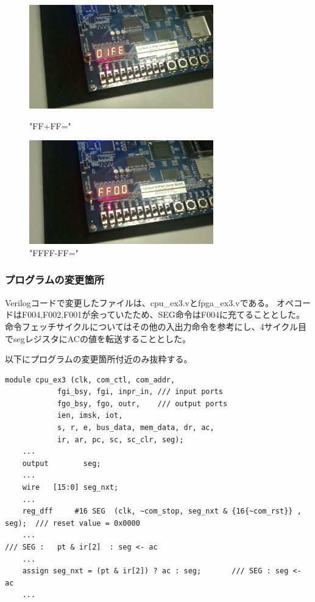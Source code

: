 \documentclass{jsarticle}
\begin{document}
\begin{figure}[htbp]
 \begin{minipage}{0.5\hsize}
  \begin{center}
  \includegraphics[width=8cm,bb=0 0 1920 1080]{FF+FF.png}
  \end{center}
  \caption{"FF+FF="}
 \end{minipage}
 \begin{minipage}{0.5\hsize}
  \begin{center}
   \includegraphics[width=8cm,bb=0 0 1920 1080]{FFFF-FF.png}
  \end{center}
  \caption{"FFFF-FF="}
 \end{minipage}
\end{figure}

\subsubsection*{プログラムの変更箇所}
Verilogコードで変更したファイルは、cpu\_ex3.vとfpga\_ex3.vである。
オペコードはF004,F002,F001が余っていたため、SEG命令はF004に充てることとした。
命令フェッチサイクルについてはその他の入出力命令を参考にし、4サイクル目でsegレジスタにACの値を転送することとした。

以下にプログラムの変更箇所付近のみ抜粋する。

\begin{lstlisting}[caption=cpu\_ex3.v]
module cpu_ex3 (clk, com_ctl, com_addr,
            fgi_bsy, fgi, inpr_in, /// input ports
            fgo_bsy, fgo, outr,    /// output ports
            ien, imsk, iot,
            s, r, e, bus_data, mem_data, dr, ac,
            ir, ar, pc, sc, sc_clr, seg);
    ...
    output        seg;
    ...
    wire   [15:0] seg_nxt;
    ...
    reg_dff     #16 SEG  (clk, ~com_stop, seg_nxt & {16{~com_rst}} , seg);  /// reset value = 0x0000
    ...
/// SEG :   pt & ir[2]  : seg <- ac
    ...
    assign seg_nxt = (pt & ir[2]) ? ac : seg;       /// SEG : seg <- ac
    ...
\end{lstlisting}
\end{document}
